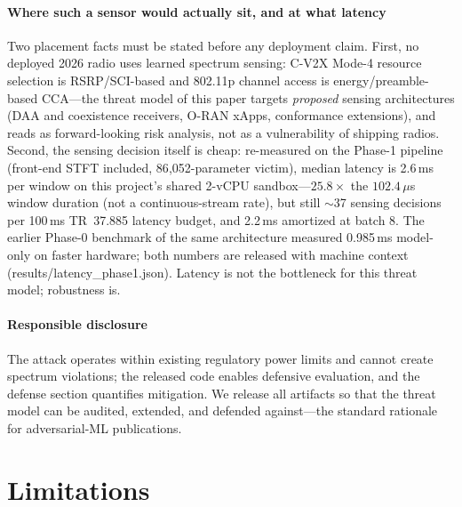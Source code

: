 \documentclass[review]{elsarticle}
\begin{document}
\paragraph{Where such a sensor would actually sit, and at what latency}
Two placement facts must be stated before any deployment claim. First,
no deployed 2026 radio uses learned spectrum sensing: C-V2X Mode-4
resource selection is RSRP/SCI-based and 802.11p channel access is
energy/preamble-based CCA---the threat model of this paper targets
\emph{proposed} sensing architectures (DAA and coexistence receivers,
O-RAN xApps, conformance extensions), and reads as forward-looking risk
analysis, not as a vulnerability of shipping radios. Second, the sensing
decision itself is cheap: re-measured on the Phase-1 pipeline (front-end
STFT included, 86{,}052-parameter victim), median latency is 2.6\,ms per
window on this project's shared 2-vCPU sandbox---$25.8\times$ the
$102.4\,\mu$s window duration (not a continuous-stream rate), but still
$\sim$37 sensing
decisions per 100\,ms TR~37.885 latency budget, and 2.2\,ms amortized at
batch 8. The earlier Phase-0 benchmark of the same architecture measured
0.985\,ms model-only on faster hardware; both numbers are released with
machine context (results/latency\_phase1.json). Latency is not the
bottleneck for this threat model; robustness is.

\paragraph{Responsible disclosure} The attack operates within existing
regulatory power limits and cannot create spectrum violations; the released
code enables defensive evaluation, and the defense section quantifies
mitigation. We release all artifacts so that the threat model can be
audited, extended, and defended against---the standard rationale for
adversarial-ML publications.

\section{Limitations}
\label{sec:limitations}
\end{document}
